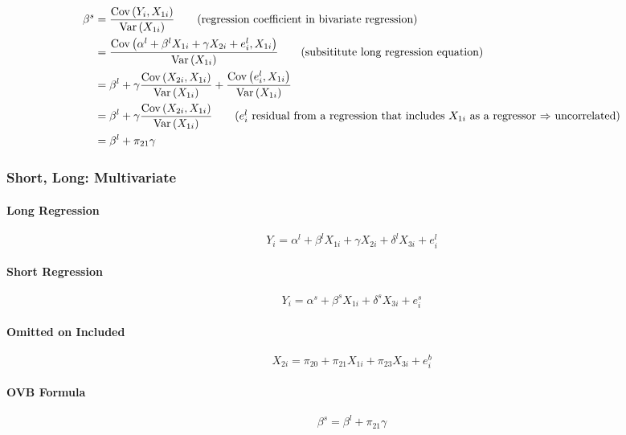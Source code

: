 \documentclass[11pt]{article}
\begin{document}
\begin{align*}
	\beta^s &= \frac{\cov{Y_i,X_{1i}}}{\var{X_{1i}}} \tag{regression coefficient in bivariate regression} \\
	&= \frac{\cov{\alpha^{l}+\beta^{l} X_{1 i}+\gamma X_{2 i}+e_{i}^{l},X_{1i}}}{\var{X_{1i}}} \tag{subsititute long regression equation} \\
	&= \beta^l + \gamma \frac{\cov{X_{2i}, X_{1i}}}{\var{X_{1i}}} + \frac{\cov{e^l_i, X_{1i}}}{\var{X_{1i}}} \\
	&= \beta^l + \gamma \frac{\cov{X_{2i}, X_{1i}}}{\var{X_{1i}}} \tag{$e^l_i$ residual from a regression that includes $X_{1i}$ as a regressor $\imp$ uncorrelated} \\
	&= \beta^{l}+\pi_{21} \gamma
\end{align*}

\subsubsection{Short, Long: Multivariate}

\paragraph*{Long Regression}
\begin{equation}
Y_{i}=\alpha^{l}+\beta^{l} X_{1 i}+\gamma X_{2 i} + \delta^{l} X_{3 i} +e_{i}^{l}
\end{equation}

\paragraph*{Short Regression}
\begin{equation}
Y_{i}=\alpha^{s}+\beta^{s} X_{1 i}+  \delta^{s} X_{3 i}+  e_{i}^{s}
\end{equation}

\paragraph*{Omitted on Included}
\begin{equation}
	X_{2i} = \pi_{20} + \pi_{21} X_{1i} + \pi_{23} X_{3i}  + e^{b}_i
\end{equation}

\paragraph*{OVB Formula}
\begin{equation}
\beta^{s}=\beta^{l}+\pi_{21} \gamma
\end{equation}
\end{document}
